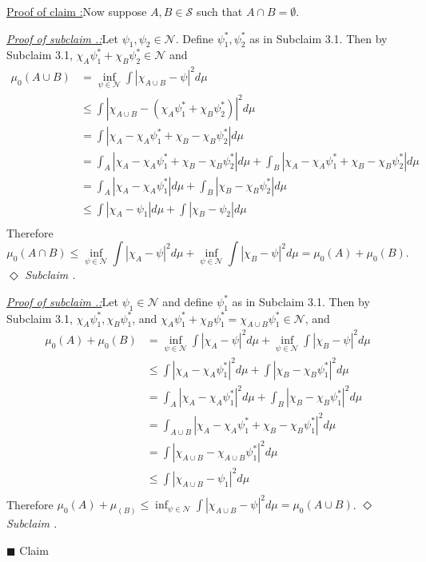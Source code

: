 \documentclass[12pt]{article}
\newcounter{ProofCounter}
\newcounter{ClaimCounter}[ProofCounter]
\newcounter{SubClaimCounter}[ClaimCounter]
\newenvironment{claimproof}[1]{\par\noindent\underline{Proof of claim \theClaimCounter:}\space#1}{\hfill $\blacksquare$ Claim \theClaimCounter}
\newenvironment{subclaim}[1]{\stepcounter{SubClaimCounter}\par\noindent\emph{\underline{Subclaim \theClaimCounter.\theSubClaimCounter:}}\space#1}{}
\newenvironment{subclaimproof}[1]{\par\noindent\emph{\underline{Proof of subclaim \theClaimCounter.\theSubClaimCounter:}}\space#1}{\hfill
$\Diamond$ \emph{Subclaim \theClaimCounter.\theSubClaimCounter}}
\begin{document}
\begin{claimproof}
Now suppose $A,B \in \mathcal{S}$ such that $A\cap B = \emptyset$.
\begin{subclaimproof}
Let $\psi_{1}, \psi_{2} \in \mathcal{N}$. Define $\psi_{1}^{*}, \psi_{2}^{*}$ as in Subclaim 3.1. Then by Subclaim 3.1, $\chi_{A}\psi_{1}^{*} +
\chi_{B}\psi_{2}^{*} \in \mathcal{N}$ and 
\begin{align*}
\mu_0(A\cup B) & = \inf_{\psi \in \mathcal{N}}\int |\chi_{A\cup B} - \psi|^{2}d\mu \\
& \leq \int|\chi_{A\cup B} - (\chi_{A}\psi_{1}^{*} + \chi_{B}\psi_{2}^{*})|^{2}d\mu \\
& = \int|\chi_{A} - \chi_{A}\psi_{1}^{*} + \chi_{B} - \chi_{B}\psi_{2}^{*}|d\mu \\
& = \int_{A}|\chi_{A} - \chi_{A}\psi_{1}^{*} + \chi_{B} - \chi_{B}\psi_{2}^{*}|d\mu + 
\int_{B}|\chi_{A} - \chi_{A}\psi_{1}^{*} + \chi_{B} - \chi_{B}\psi_{2}^{*}|d\mu \\
& = \int_{A}|\chi_{A} - \chi_{A}\psi_{1}^{*}|d\mu + \int_{B}|\chi_{B} - \chi_{B}\psi_{2}^{*}|d\mu \\
& \leq \int|\chi_{A} - \psi_{1}|d\mu + \int|\chi_{B} - \psi_{2}|d\mu \\
\end{align*}
Therefore 
\[ \mu_0(A\cap B) \leq \inf_{\psi\in \mathcal{N}}\int|\chi_{A} - \psi|^{2}d\mu + \inf_{\psi\in\mathcal{N}}\int|\chi_{B} - \psi|^{2}d\mu =
\mu_0(A) + \mu_0(B). \]
\end{subclaimproof}

\begin{subclaimproof}
Let $\psi_{1} \in \mathcal{N}$ and define $\psi_{1}^{*}$ as in Subclaim 3.1. Then by Subclaim 3.1, $\chi_{A}\psi_{1}^{*}, \chi_{B}\psi_{1}^{*}$, and
$\chi_{A}\psi_{1}^{*} + \chi_{B}\psi_{1}^{*} = \chi_{A\cup B}\psi_{1}^{*} \in \mathcal{N}$, and 
\begin{align*}
\mu_0(A) + \mu_0(B) & = \inf_{\psi\in\mathcal{N}}\int|\chi_{A} - \psi|^{2}d\mu + \inf_{\psi\in\mathcal{N}}\int|\chi_{B} - \psi|^{2}d\mu \\
& \leq \int|\chi_{A} - \chi_{A}\psi_{1}^{*}|^{2}d\mu + \int|\chi_{B} - \chi_{B}\psi_{1}^{*}|^{2}d\mu \\
& = \int_{A}|\chi_{A} - \chi_{A}\psi_{1}^{*}|^{2}d\mu + \int_{B}|\chi_{B} - \chi_{B}\psi_{1}^{*}|^{2}d\mu \\
& = \int_{A\cup B}|\chi_{A} - \chi_{A}\psi_{1}^{*} + \chi_{B} - \chi_{B}\psi_{1}^{*}|^{2}d\mu \\
& = \int|\chi_{A\cup B} - \chi_{A\cup B}\psi_{1}^{*}|^{2}d\mu \\
& \leq \int|\chi_{A\cup B} - \psi_{1}|^{2}d\mu \\
\end{align*}
Therefore $\mu_0(A) + \mu_(B) \leq \inf_{\psi\in\mathcal{N}}\int|\chi_{A\cup B} - \psi|^{2}d\mu = \mu_0(A\cup B)$.
\end{subclaimproof}


\end{claimproof}
\end{document}
